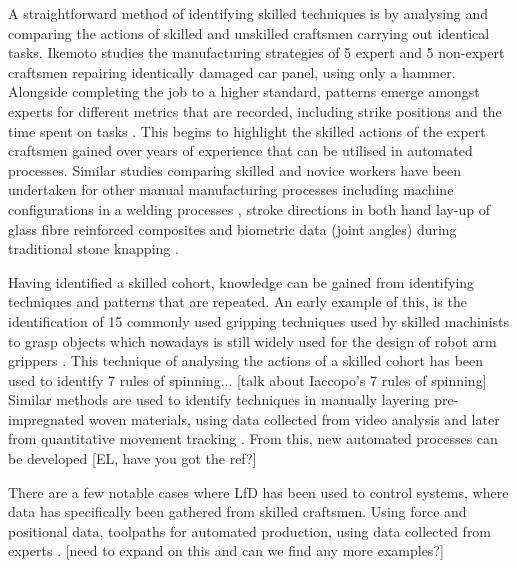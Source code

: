 A straightforward method of identifying skilled techniques is by analysing and comparing the actions of skilled and unskilled craftsmen carrying out identical tasks. Ikemoto studies the manufacturing strategies of 5 expert and 5 non-expert craftsmen repairing identically damaged car panel, using only a hammer.  Alongside completing the job to a higher standard, patterns emerge amongst experts for different metrics that are recorded, including strike positions \citep{Ikemoto2018ProcessRepair} and the time spent on tasks \citep{Ikemoto2016ARepair}. This begins to highlight the skilled actions of the expert craftsmen gained over years of experience that can be utilised in automated processes. Similar studies comparing skilled and novice workers have been undertaken for other manual manufacturing processes including machine configurations in a welding processes \citep{Manorathna2017HumanAutomation}, stroke directions in both hand lay-up of glass fibre reinforced composites \citep{Xie2016EffectMethod, Kikuchi2016ResearchLay-up} and biometric data (joint angles) during traditional stone knapping \citep{Rein2014MovementTraditions}. 

Having identified a skilled cohort, knowledge can be gained from identifying techniques and patterns that are repeated. An early example of this, is the identification of 15 commonly used gripping techniques used by skilled machinists to grasp objects \citep{Cutkosky1986ModellingHands} which nowadays is still widely used for the design of robot arm grippers \citep{Feix2016TheTypes}. This technique of analysing the actions of a skilled cohort has been used to identify 7 rules of spinning... [talk about Iaccopo's 7 rules of spinning]
Similar methods are used to identify techniques in manually layering pre-impregnated woven materials, using data collected from video analysis \citep{Elkington2015HandProcess, Elkington2015StudyingLayup} and later from quantitative movement tracking \citep{Prabhu2017DigitisationTechnology}. From this, new automated processes can be developed [EL, have you got the ref?]

There are a few notable cases where LfD has been used to control systems, where data has specifically been gathered from skilled craftsmen. Using force and positional data, toolpaths for automated production, using data collected from experts \citep{Ng2017CapturingGrinding}. [need to expand on this and can we find any more examples?]




